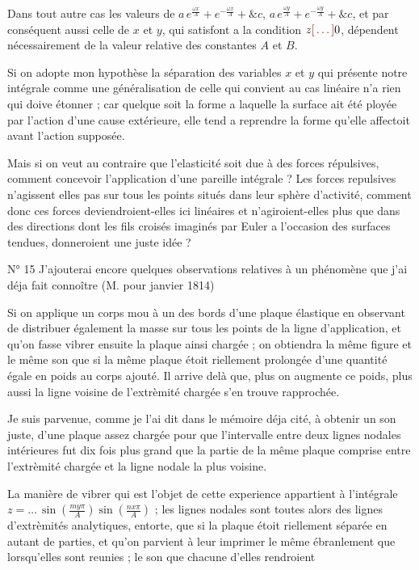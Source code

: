 \documentclass[11pt,a4paper]{article}
\begin{document}
Dans tout autre cas les valeurs de
$a\, e^{\frac{\omega x}{A}} + e^{-\frac{\omega x}{A}} + \&c$,
$a\, e^{\frac{\omega y}{A}} + e^{-\frac{\omega y}{A}} + \&c$, et par
conséquent aussi celle de $x$ et $y$, qui satisfont a la condition
$z \ill{} 0$, dépendent nécessairement de la valeur relative des constantes
$A$ et $B$.

Si on adopte mon hypothèse la séparation des variables $x$ et $y$ qui présente
notre  intégrale comme une généralisation de celle qui
convient au cas linéaire n'a rien qui doive étonner ; car quelque soit la
forme a laquelle la surface ait été ployée par l'action d'une cause
extérieure, elle tend a reprendre la forme qu'elle affectoit avant l'action
supposée.

Mais si on veut au contraire que l'elasticité soit due à des forces
répulsives, comment concevoir l'application d'une pareille intégrale ? Les
forces repulsives n'agissent elles pas sur tous les points situés dans leur
sphère d'activité, comment donc ces forces deviendroient-elles ici linéaires
et n'agiroient-elles plus que dans des directions dont les fils croisés
imaginés par Euler a l'occasion des surfaces tendues, donneroient une juste
idée ?

N° 15 J'ajouterai encore quelques observations relatives à un phénomène que
j'ai déja fait connoître (M. pour janvier 1814)

Si on applique un corps mou à un des bords d'une plaque élastique en observant
de distribuer également la masse sur tous les points de la ligne
d'application, et qu'on fasse vibrer ensuite la plaque ainsi chargée ; on
obtiendra la même figure et le même son que si la même plaque étoit riellement
prolongée d'une quantité égale en poids au corps ajouté. Il arrive delà que,
plus on augmente ce poids, plus aussi la ligne voisine de l'extrèmité chargée
s'en trouve rapprochée.

Je suis parvenue, comme je l'ai dit dans le mémoire déja cité, à obtenir un
son juste, d'une plaque assez chargée pour que l'intervalle entre deux lignes
nodales intérieures fut dix fois plus grand que la partie de la même plaque
comprise entre l'extrèmité chargée et la ligne nodale la plus voisine.

La manière de vibrer qui est l'objet de cette experience appartient à
l'intégrale $z = \ldots\, \sin\left( \frac{m y \pi}{A} \right)
\sin\left( \frac{n x \pi}{A} \right)$ ; les lignes nodales sont toutes alors
des lignes d'extrèmités analytiques, entorte, que si la plaque étoit
riellement séparée en autant de parties, et qu'on parvient à leur imprimer le
même ébranlement que lorsqu'elles sont reunies ; le son que chacune d'elles
rendroient
\end{document}
